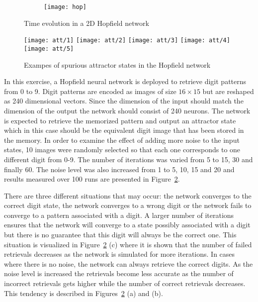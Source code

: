 \documentclass[conference,compsoc]{IEEEtran}
\begin{document}
 \begin{figure}
	\begin{subfigure}{8cm}
            \texttt{[image: hop]}          
        \end{subfigure}
        \caption{Time evolution in a 2D Hopfield network}               
        \label{fig:hop}
    \end{figure}
\begin{figure}   
\centering
{}
  \texttt{[image: att/1]}
\endminipage
\vspace{1mm}
  \texttt{[image: att/2]}
\endminipage
\vspace{1mm}
%
  \texttt{[image: att/3]}
\endminipage
{}%
  \texttt{[image: att/4]}
\endminipage
{}%
  \texttt{[image: att/5]}
\endminipage

\caption{Exampes of spurious attractor states in the Hopfield network}
\label{fig:hop2}
\end{figure}
In this exercise, a Hopfield neural network is deployed to retrieve digit patterns from 0 to 9. Digit patterns are encoded as images of size $16 \times 15$ but are reshaped as 240 dimensional vectors. Since the dimension of the input should match the dimension of the output the network should consist of 240 neurons. The network is expected to retrieve the memorized pattern and output an attractor state which in this case should be the equivalent digit image that has been stored in the memory. In order to examine the effect of adding more noise to the input states, 10 images were randomly selected so that each one corresponds to one different digit from 0-9. The number of iterations was varied from 5 to 15, 30 and finally 60. The noise level was also increased from 1 to 5, 10, 15 and 20 and results measured over 100 runs are presented in Figure~\ref{fig:hop2}.

 There are three different situations that may occur: the network converges to the correct digit state, the network converges to a wrong digit or the network fails to converge to a pattern associated with a digit. A larger number of iterations ensures that the network will converge to a state possibly associated with a digit but there is no guarantee that this digit will always be the correct one. This situation is visualized in Figure~\ref{fig:hop2} (c) where it is shown that the number of failed retrievals decreases as the network is simulated for more iterations. In cases where there is no noise, the network can always retrieve the correct digits. As the noise level is increased the retrievals become less accurate as the number of incorrect retrievals gets higher while the number of correct retrievals decreases. This tendency is described in Figures~\ref{fig:hop2} (a) and (b).
 
\end{document}
